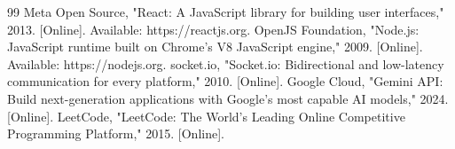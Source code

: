 \documentclass[12pt,a4paper]{report}
\begin{document}
\begin{thebibliography}{99}
 Meta Open Source, "React: A JavaScript library for building user interfaces," 2013. [Online]. Available: https://reactjs.org.
 OpenJS Foundation, "Node.js: JavaScript runtime built on Chrome's V8 JavaScript engine," 2009. [Online]. Available: https://nodejs.org.
 socket.io, "Socket.io: Bidirectional and low-latency communication for every platform," 2010. [Online].
 Google Cloud, "Gemini API: Build next-generation applications with Google’s most capable AI models," 2024. [Online].
 LeetCode, "LeetCode: The World's Leading Online Competitive Programming Platform," 2015. [Online].
\end{thebibliography}
\end{document}
